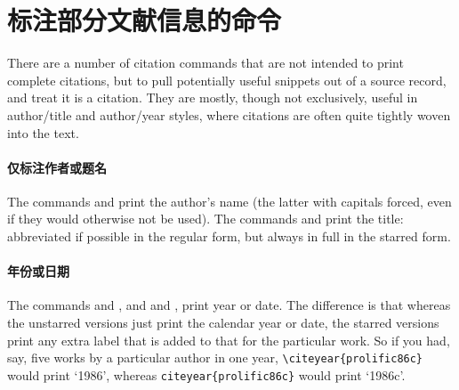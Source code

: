 \section{标注部分文献信息的命令}

There are a number of citation commands that are not intended to print
complete citations, but to pull potentially useful snippets out of a
source record, and treat it is a citation. They are mostly, though not
exclusively, useful in author/title and author/year styles, where
citations are often quite tightly woven into the text.

\paragraph{仅标注作者或题名} The commands  and
 print the author's name (the latter with capitals
forced, even if they would otherwise not be used). The commands
 and  print the title: abbreviated if
possible in the regular form, but always in full in the starred form.


\paragraph{年份或日期} The commands 
and , and  and , print year
or date. The difference is that whereas the unstarred versions just
print the calendar year or date, the starred versions print any extra
label that is added to that for the particular work. So if you had,
say, five works by a particular author in one year,
\verb|\citeyear{prolific86c}| would print `1986', whereas
\verb|citeyear{prolific86c}| would print `1986c'.

